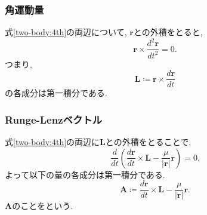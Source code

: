\documentclass{ltjsarticle}
\theoremstyle{definition}
\numberwithin{thm}{section}
\theoremstyle{definition}
\numberwithin{prop}{section}
\theoremstyle{definition}
\numberwithin{dfn}{section}
\numberwithin{equation}{section}
\begin{document}
\subsubsection{角運動量}
式\ref{two-body:4th}の両辺について, $\bm{r}$との外積をとると,
\begin{equation*}
    \bm{r}\times \frac{d^2\bm{r}}{dt^2}=0.
\end{equation*}
つまり,
\begin{equation}
    \bm{L}\coloneq \bm{r}\times\frac{d\bm{r}}{dt}
\end{equation}
の各成分は第一積分である.
\subsubsection{Runge-Lenzベクトル}
式\ref{two-body:4th}の両辺に$\bm{L}$との外積をとることで,
\begin{equation*}
    \frac{d}{dt}\left(\frac{d\bm{r}}{dt}\times\bm{L}-\frac{\mu}{|\bm{r}|}\bm{r}\right)=0.
\end{equation*}
よって以下の量の各成分は第一積分である.
\begin{equation} \label{two-body:Runge-Lenz}
    \bm{A}\coloneq \frac{d\bm{r}}{dt}\times\bm{L}-\frac{\mu}{|\bm{r}|}\bm{r}.
\end{equation}
$\bm{A}$のことをという.
\end{document}
